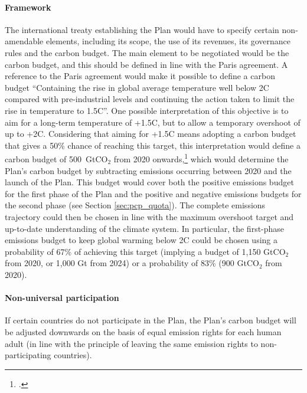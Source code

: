 \documentclass[a5paper,english,openany]{memoir}
\begin{document}
\paragraph{Framework} %
The international treaty establishing the Plan would have to specify certain non-amendable elements, including its scope, the use of its revenues, its governance rules and the carbon budget. The main element to be negotiated would be the carbon budget, and this should be defined in line with the Paris agreement. A reference to the Paris agreement would make it possible to define a carbon budget ``Containing the rise in global average temperature well below 2\textdegree{}C compared with pre-industrial levels and continuing the action taken to limit the rise in temperature to 1.5\textdegree{}C''. One possible interpretation of this objective is to aim for a long-term temperature of +1.5\textdegree{}C, but to allow a temporary overshoot of up to +2\textdegree{}C. 
Considering that aiming for +1.5\textdegree{}C means adopting a carbon budget that gives a 50\% chance of reaching this target, this interpretation would define a carbon budget of 500~GtCO$_\text{2}$ from 2020 onwards,\footnote{\citet{ipcc_climate_2021}.} 
which would determine the Plan's carbon budget by subtracting emissions occurring between 2020 and the launch of the Plan. This budget would cover both the positive emissions budget for the first phase of the Plan and the positive and negative emissions budgets for the second phase (see Section \ref{sec:pcp_quota}). 
The complete emissions trajectory 
could then be chosen in line with the maximum overshoot target and up-to-date understanding of the climate system. 
In particular, the first-phase emissions budget to keep global warming below 2\textdegree{}C could be chosen using a probability of 67\% of achieving this target (implying a budget of 1,150 GtCO$_\text{2}$ from 2020, or 1,000 Gt from 2024) or a probability of 83\% (900 GtCO$_\text{2}$ from 2020). 

\paragraph{Non-universal participation}
If certain countries do not participate in the Plan, the Plan's carbon budget will be adjusted downwards on the basis of equal emission rights for each human adult (in line with the principle of leaving the same emission rights to non-participating countries).
\end{document}
